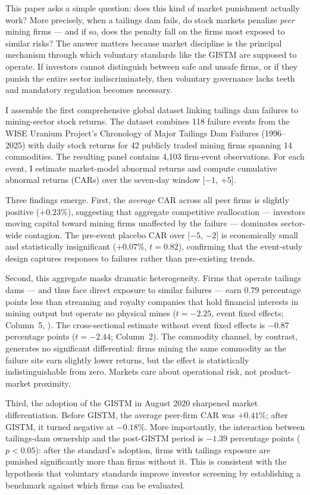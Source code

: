 \documentclass[12pt]{article}
\begin{document}
This paper asks a simple question: does this kind of market punishment actually work? More precisely, when a tailings dam fails, do stock markets penalize \emph{peer} mining firms --- and if so, does the penalty fall on the firms most exposed to similar risks? The answer matters because market discipline is the principal mechanism through which voluntary standards like the GISTM are supposed to operate. If investors cannot distinguish between safe and unsafe firms, or if they punish the entire sector indiscriminately, then voluntary governance lacks teeth and mandatory regulation becomes necessary.

I assemble the first comprehensive global dataset linking tailings dam failures to mining-sector stock returns. The dataset combines 118 failure events from the WISE Uranium Project's Chronology of Major Tailings Dam Failures (1996--2025) with daily stock returns for 42 publicly traded mining firms spanning 14 commodities. The resulting panel contains 4,103 firm-event observations. For each event, I estimate market-model abnormal returns and compute cumulative abnormal returns (CARs) over the seven-day window [$-1$, $+5$].

Three findings emerge. First, the \emph{average} CAR across all peer firms is slightly positive ($+0.23\%$), suggesting that aggregate competitive reallocation --- investors moving capital toward mining firms unaffected by the failure --- dominates sector-wide contagion. The pre-event placebo CAR over [$-5$, $-2$] is economically small and statistically insignificant ($+0.07\%$, $t=0.82$), confirming that the event-study design captures responses to failures rather than pre-existing trends.

Second, this aggregate masks dramatic heterogeneity. Firms that operate tailings dams --- and thus face direct exposure to similar failures --- earn $0.79$ percentage points less than streaming and royalty companies that hold financial interests in mining output but operate no physical mines ($t=-2.25$, event fixed effects; Column~5, ). The cross-sectional estimate without event fixed effects is $-0.87$ percentage points ($t=-2.44$; Column~2). The commodity channel, by contrast, generates no significant differential: firms mining the same commodity as the failure site earn slightly lower returns, but the effect is statistically indistinguishable from zero. Markets care about operational risk, not product-market proximity.

Third, the adoption of the GISTM in August 2020 sharpened market differentiation. Before GISTM, the average peer-firm CAR was $+0.41\%$; after GISTM, it turned negative at $-0.18\%$. More importantly, the interaction between tailings-dam ownership and the post-GISTM period is $-1.39$ percentage points ($p<0.05$): after the standard's adoption, firms with tailings exposure are punished significantly more than firms without it. This is consistent with the hypothesis that voluntary standards improve investor screening by establishing a benchmark against which firms can be evaluated.
\end{document}
